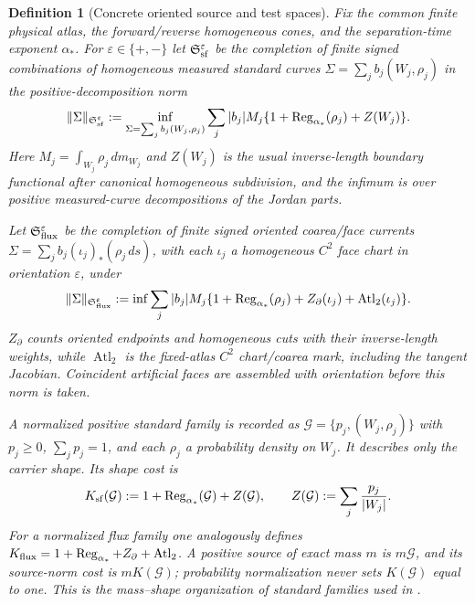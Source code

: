 \documentclass[11pt]{article}
\newtheorem{definition}[theorem]{Definition}
\begin{document}
\begin{definition}[Concrete oriented source and test spaces]
\label{def:concrete-source-spaces}
Fix the common finite physical atlas, the forward/reverse homogeneous cones,
and the separation-time exponent $\alpha_*$.
For $\varepsilon\in\{+,-\}$ let
$\mathfrak S_{\rm sf}^{\varepsilon}$ be the completion of finite signed
combinations of homogeneous measured standard curves
$\Sigma=\sum_j b_j(W_j,\rho_j)$ in the positive-decomposition norm
\begin{equation}
\label{eq:standard-family-source-norm}
 \|\Sigma\|_{\mathfrak S_{\rm sf}^{\varepsilon}}
 :=\inf_{\Sigma=\sum_jb_j(W_j,\rho_j)}
 \sum_j|b_j|M_j
 \{1+\operatorname{Reg}_{\alpha_*}(\rho_j)+Z(W_j)\}.
\end{equation}
Here $M_j=\int_{W_j}\rho_j\,dm_{W_j}$ and $Z(W_j)$ is the usual inverse-length
boundary functional after canonical homogeneous subdivision, and the
infimum is over positive measured-curve decompositions of the Jordan parts.

Let $\mathfrak S_{\rm flux}^{\varepsilon}$ be the completion of finite signed
oriented coarea/face currents
$\Sigma=\sum_jb_j(\iota_j)_*(\rho_j\,ds)$, with each $\iota_j$ a homogeneous
$C^2$ face chart in orientation $\varepsilon$, under
\begin{equation}
\label{eq:flux-source-norm}
 \|\Sigma\|_{\mathfrak S_{\rm flux}^{\varepsilon}}
 :=\inf\sum_j|b_j|M_j
 \{1+\operatorname{Reg}_{\alpha_*}(\rho_j)+Z_{\partial}(\iota_j)
       +\operatorname{Atl}_2(\iota_j)\}.
\end{equation}
$Z_{\partial}$ counts oriented endpoints and homogeneous cuts with their
inverse-length weights, while $\operatorname{Atl}_2$ is the fixed-atlas
$C^2$ chart/coarea mark, including the tangent Jacobian.  Coincident
artificial faces are assembled with orientation before this norm is taken.

A normalized positive standard family is recorded as
$\mathcal G=\{p_j,(W_j,\rho_j)\}$ with $p_j\ge0$, $\sum_jp_j=1$, and each
$\rho_j$ a probability density on $W_j$.  It describes only the carrier
shape.  Its shape cost is
\begin{equation}
\label{eq:normalized-source-shape-cost}
 K_{\rm sf}(\mathcal G):=
  1+\operatorname{Reg}_{\alpha_*}(\mathcal G)+Z(\mathcal G),
 \qquad Z(\mathcal G):=\sum_j\frac{p_j}{|W_j|}.
\end{equation}
For a normalized flux family one analogously defines
$K_{\rm flux}=1+\operatorname{Reg}_{\alpha_*}+Z_\partial+
\operatorname{Atl}_2$.  A positive source of exact mass $m$ is $m\mathcal G$,
and its source-norm cost is $mK(\mathcal G)$; probability normalization never
sets $K(\mathcal G)$ equal to one.  This is the mass--shape organization of
standard families used in \cite{CanestrariHoles}.


\end{definition}
\end{document}
